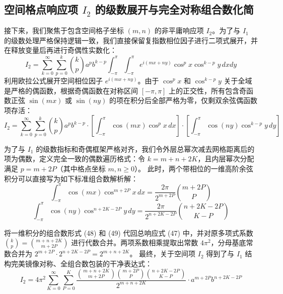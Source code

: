 \documentclass[11pt,a4paper]{ctexart}
\begin{document}
\subsection{空间格点响应项 $I_2$ 的级数展开与完全对称组合数化简}
接下来，我们聚焦于包含空间格子坐标 $(m,n)$ 的非平庸响应项 $I_2$。为了与 $I_1$ 的级数处理严格保持逻辑一致，我们直接保留复指数相位因子进行二项式展开，并在释放变量后再进行奇偶性实数化：
\begin{equation}
I_2 = \sum_{k=0}^{\infty} \sum_{p=0}^{k} \binom{k}{p} a^p b^{k-p} \int_{-\pi}^{\pi} \int_{-\pi}^{\pi} e^{i(mx + ny)} \cos^p x \cos^{k-p} y \, dx dy
\end{equation}
利用欧拉公式展开空间相位因子 $e^{i(mx+ny)}$。由于 $\cos^p x$ 和 $\cos^{k-p} y$ 关于全域是严格的偶函数，根据奇偶函数在对称区间 $[-\pi, \pi]$ 上的正交性，所有包含奇函数正弦 $\sin(mx)$ 或 $\sin(ny)$ 的项在积分后全部严格为零，仅剩双余弦偶函数项存活：
\begin{equation}
I_2 = \sum_{k=0}^{\infty} \sum_{p=0}^{k} \binom{k}{p} a^p b^{k-p} \cdot \left[ \int_{-\pi}^{\pi} \cos(mx) \cos^p x \, dx \right] \cdot \left[ \int_{-\pi}^{\pi} \cos(ny) \cos^{k-p} y \, dy \right]
\end{equation}

为了与 $I_1$ 的级数指标和奇偶框架严格对齐，我们令外层总幂次减去网格距离后的项为偶数，定义完全一致的偶数遍历格式：令 $k = m + n + 2K$，且内层幂次分配满足 $p = m + 2P$（其中格点坐标 $m, n \ge 0$）。
此时，两个带相位的一维高阶余弦积分可以直接写为如下标准组合数解析解：
\begin{equation}
\int_{-\pi}^{\pi} \cos(mx) \cos^{m+2P} x \, dx = \frac{2\pi}{2^{m+2P}} \binom{m+2P}{P}
\end{equation}
\begin{equation}
\int_{-\pi}^{\pi} \cos(ny) \cos^{n+2K-2P} y \, dy = \frac{2\pi}{2^{n+2K-2P}} \binom{n+2K-2P}{K-P}
\end{equation}

将一维积分的组合数形式 (48) 和 (49) 代回总响应式 (47) 中，并对原多项式系数 $\binom{k}{p} = \binom{m+n+2K}{m+2P}$ 进行代数合并。两项系数相乘提取出常数 $4\pi^2$，分母基底常数合并为 $2^{m+2P} \cdot 2^{n+2K-2P} = 2^{m+n+2K}$。
最终，关于空间项 $I_2$ 得到了与 $I_1$ 结构完美镜像对称、全组合数包装的干净表达式：
\begin{equation}
I_2 = 4\pi^2 \sum_{K=0}^{\infty} \sum_{P=0}^{K} \frac{\binom{m+n+2K}{m+2P} \binom{m+2P}{P} \binom{n+2K-2P}{K-P}}{2^{m+n+2K}} \cdot a^{m+2P} b^{n+2K-2P}
\end{equation}
\end{document}
